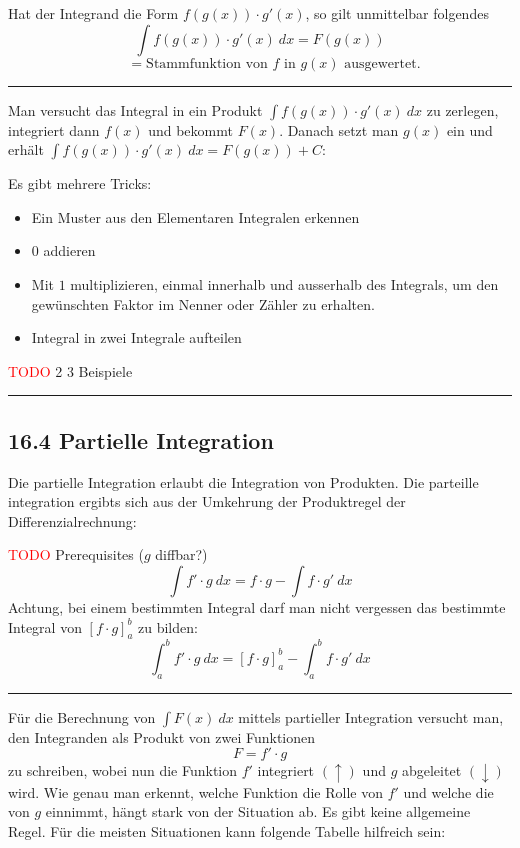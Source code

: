 \documentclass[a4paper,landscape,8pt]{extarticle}
\newcommand{\todo}{\textcolor{red}{TODO }}
\newcommand{\sep}{\vspace{5pt}\noindent\hrule\vspace{5pt}}
\begin{document}
\begin{multicols*}{4}
\Satz Hat der Integrand die Form $f(g(x))\cdot g'(x)$, so gilt unmittelbar
folgendes
\[
\int f(g(x))\cdot g'(x) \ dx = F(g(x))
\]
\[
\qquad = \text{Stammfunktion von } f \text{ in }
g(x) \text{ ausgewertet.}
\]

\sep

\Vorgehen Man versucht das Integral in ein Produkt $\int f(g(x))\cdot g'(x) \
dx$ zu zerlegen, integriert dann $f(x)$ und bekommt $F(x)$. Danach setzt man
$g(x)$ ein und erhält $\int f(g(x))\cdot g'(x) \ dx = F(g(x))+ C$:

\Trick Es gibt mehrere Tricks:
\begin{itemize}
  \item Ein Muster aus den Elementaren Integralen erkennen
  \item $0$ addieren
  \item Mit $1$ multiplizieren, einmal innerhalb und ausserhalb des Integrals,
  um den gewünschten Faktor im Nenner oder Zähler zu erhalten.
  \item Integral in zwei Integrale aufteilen
\end{itemize}

\begin{warmup}
\Bsp
\todo 2 3 Beispiele
\end{warmup}

\sep

\subsection{16.4 Partielle Integration}

Die partielle Integration erlaubt die Integration von Produkten. Die parteille
integration ergibts sich aus der Umkehrung der Produktregel der
Differenzialrechnung:

\Satz \todo Prerequisites ($g$ diffbar?) 
\[
\int f'\cdot g \ dx = f\cdot g - \int f \cdot g' \ dx
\]
Achtung, bei einem bestimmten Integral darf man nicht vergessen das bestimmte
Integral von $[f\cdot g]_a^b$ zu bilden:
\[
\int_a^b f'\cdot g \ dx = \left[f\cdot g\right]_a^b - \int_a^b f\cdot g' \ dx
\]

\sep

\Vorgehen Für die Berechnung von $\int F(x) \ dx$ mittels partieller Integration
versucht man, den Integranden als Produkt von zwei Funktionen
\[
F = f'\cdot g
\]
zu schreiben, wobei nun die Funktion $f'$ integriert $(\uparrow)$ und $g$
abgeleitet $(\downarrow)$ wird. Wie genau man erkennt, welche Funktion die Rolle
von $f'$ und welche die von $g$ einnimmt, hängt stark von der Situation ab. Es
gibt keine allgemeine Regel. Für die meisten Situationen kann folgende Tabelle
hilfreich sein:


\end{multicols*}
\end{document}
